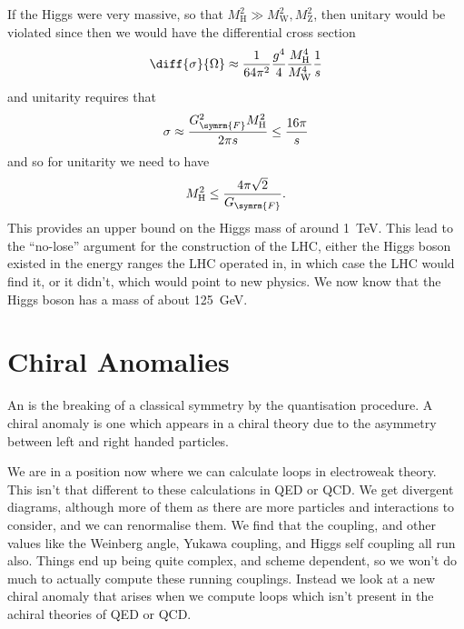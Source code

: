 \documentclass[fleqn]{NotesClass}
\newcommand{\Pparticle}[1]{\mathrm{#1}}
\newcommand{\PZ}{\ensuremath{\Pparticle{Z}}}
\newcommand{\PW}{\ensuremath{\Pparticle{W}}}
\newcommand{\Phiggs}{\ensuremath{\Pparticle{H}}}
\newcommand{\fermiConst}{G_{\symrm{F}}}
\begin{document}
    If the Higgs were very massive, so that \(M_{\Phiggs}^2 \gg M_{\PW}^2, M_{\PZ}^2\), then unitary would be violated since then we would have the differential cross section
    \begin{equation}
        \diff{\sigma}{\Omega} \approx \frac{1}{64\pi^2} \frac{g^4}{4} \frac{M_{\Phiggs}^4}{M_{\PW}^4} \frac{1}{s}
    \end{equation}
    and unitarity requires that
    \begin{equation}
        \sigma \approx \frac{\fermiConst^2 M_{\Phiggs}^2}{2\pi s} \le \frac{16\pi}{s}
    \end{equation}
    and so for unitarity we need to have
    \begin{equation}
        M_{\Phiggs}^2 \le \frac{4\pi\sqrt{2}}{\fermiConst}.
    \end{equation}
    This provides an upper bound on the Higgs mass of around \qty{1}{\tera\electronvolt}.
    This lead to the \enquote{no-lose} argument for the construction of the LHC, either the Higgs boson existed in the energy ranges the LHC operated in, in which case the LHC would find it, or it didn't, which would point to new physics.
    We now know that the Higgs boson has a mass of about \qty{125}{\giga\electronvolt}.
    
    \chapter{Chiral Anomalies}
    An  is the breaking of a classical symmetry by the quantisation procedure.
    A chiral anomaly is one which appears in a chiral theory due to the asymmetry between left and right handed particles.
    
    We  are in a position now where we can calculate loops in electroweak theory.
    This isn't that different to these calculations in QED or QCD.
    We get divergent diagrams, although more of them as there are more particles and interactions to consider, and we can renormalise them.
    We find that the coupling, and other values like the Weinberg angle, Yukawa coupling, and Higgs self coupling all run also.
    Things end up being quite complex, and scheme dependent, so we won't do much to actually compute these running couplings.
    Instead we look at a new chiral anomaly that arises when we compute loops which isn't present in the achiral theories of QED or QCD.
    
\end{document}
